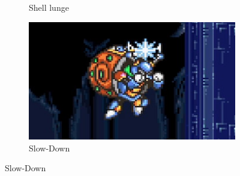 \begin{figure}
\begin{subfigure}{0.45\linewidth}
		\caption{Shell lunge}
	\end{subfigure}
	\begin{subfigure}{0.45\linewidth}
		\centering
		\includegraphics[width=\linewidth]{figures/X2/Crystal_snail/Crystal_DM.png}
		\caption{Slow-Down}
	\end{subfigure}
\end{figure}
